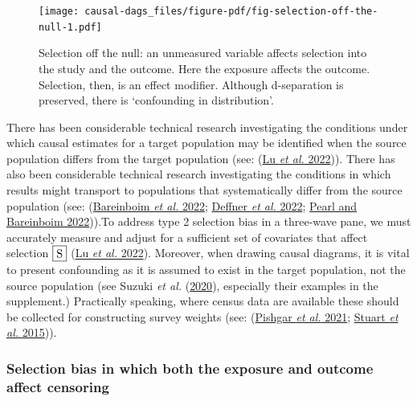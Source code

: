 \documentclass[
  singlecolumn]{article}
\begin{document}
\begin{figure}

{\centering \texttt{[image: causal-dags\_files/figure-pdf/fig-selection-off-the-null-1.pdf]}

}

\caption{\label{fig-selection-off-the-null}Selection off the null: an
unmeasured variable affects selection into the study and the outcome.
Here the exposure affects the outcome. Selection, then, is an effect
modifier. Although d-separation is preserved, there is `confounding in
distribution'.}

\end{figure}

There has been considerable technical research investigating the
conditions under which causal estimates for a target population may be
identified when the source population differs from the target population
(see: (\protect\hyperlink{ref-lu2022}{Lu \emph{et al.} 2022})). There
has also been considerable technical research investigating the
conditions in which results might transport to populations that
systematically differ from the source population (see:
(\protect\hyperlink{ref-bareinboim2022}{Bareinboim \emph{et al.} 2022};
\protect\hyperlink{ref-deffner2022}{Deffner \emph{et al.} 2022};
\protect\hyperlink{ref-pearl2022}{Pearl and Bareinboim 2022})).To
address type 2 selection bias in a three-wave pane, we must accurately
measure and adjust for a sufficient set of covariates that affect
selection \(\framebox{S}\) (\protect\hyperlink{ref-lu2022}{Lu \emph{et
al.} 2022}). Moreover, when drawing causal diagrams, it is vital to
present confounding as it is assumed to exist in the target population,
not the source population (see Suzuki \emph{et al.}
(\protect\hyperlink{ref-suzuki2020}{2020}), especially their examples in
the supplement.) Practically speaking, where census data are available
these should be collected for constructing survey weights (see:
(\protect\hyperlink{ref-pishgar2021}{Pishgar \emph{et al.} 2021};
\protect\hyperlink{ref-stuart2015}{Stuart \emph{et al.} 2015})).

\hypertarget{selection-bias-in-which-both-the-exposure-and-outcome-affect-censoring}{%
\subsubsection{Selection bias in which both the exposure and outcome
affect
censoring}\label{selection-bias-in-which-both-the-exposure-and-outcome-affect-censoring}}
\end{document}
